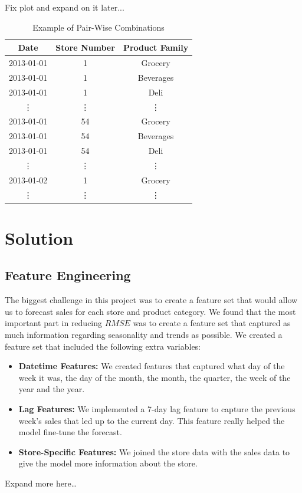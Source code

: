\documentclass[12pt]{article}
\begin{document}
Fix plot and expand on it later...
\begin{table}[H]
\centering
\begin{tabular}{|c|c|c|}
\hline
\textbf{Date} & \textbf{Store Number} & \textbf{Product Family} \\ \hline
2013-01-01 & 1 & Grocery \\ \hline
2013-01-01 & 1 & Beverages \\ \hline
2013-01-01 & 1 & Deli \\ \hline
\vdots & \vdots & \vdots \\ \hline
2013-01-01 & 54 & Grocery \\ \hline
2013-01-01 & 54 & Beverages \\ \hline
2013-01-01 & 54 & Deli \\ \hline
\vdots & \vdots & \vdots \\ \hline
2013-01-02 & 1 & Grocery \\ \hline
\vdots & \vdots & \vdots \\ \hline
\end{tabular}
\caption{Example of Pair-Wise Combinations}
\end{table}
\section{Solution}
\subsection{Feature Engineering}
The biggest challenge in this project was to create a feature set that would allow us to forecast sales for each store and product category.
We found that the most important part in reducing $RMSE$ was to create a feature set that captured as much information regarding seasonality and trends as possible.
We created a feature set that included the following extra variables:

\begin{itemize}
    \item \textbf{Datetime Features:} We created features that captured what day of the week it was, the day of the month, the month, the quarter, the week of the year and the year.
    \item \textbf{Lag Features:} We implemented a 7-day lag feature to capture the previous week's sales that led up to the current day. This feature really helped the model fine-tune the forecast.
    \item \textbf{Store-Specific Features:} We joined the store data with the sales data to give the model more information about the store. 
\end{itemize}
Expand more here\dots
\end{document}
